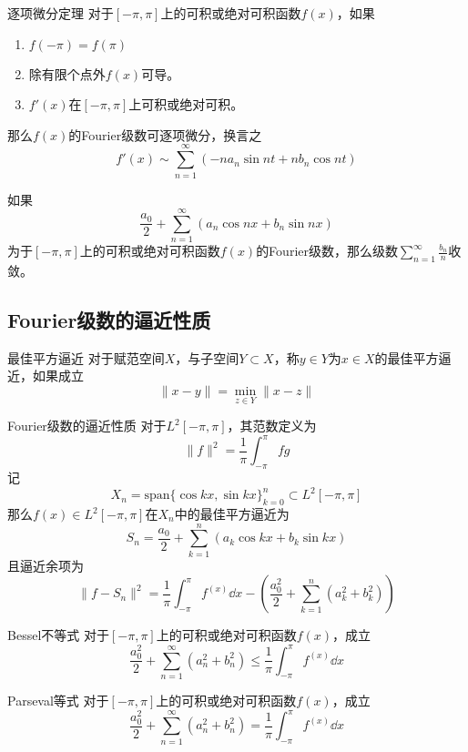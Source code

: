 \documentclass[lang = cn, scheme = chinese, thmcnt = section]{elegantbook}
\newcommand{\sub}{\subset}             %
\newcommand{\dis}{\displaystyle}
\begin{document}
\begin{theorem}{逐项微分定理}
	对于$[-\pi,\pi]$上的可积或绝对可积函数$f(x)$，如果
	\begin{enumerate}
		\item $f(-\pi)=f(\pi)$
		\item 除有限个点外$f(x)$可导。
		\item $f'(x)$在$[-\pi,\pi]$上可积或绝对可积。
	\end{enumerate}
	那么$f(x)$的Fourier级数可逐项微分，换言之
	$$
	f'(x)\sim \sum_{n=1}^{\infty}(-na_n\sin nt+nb_n\cos nt)
	$$
\end{theorem}

\begin{corollary}
	如果
	$$
	\frac{a_0}{2}+\sum_{n=1}^{\infty}(a_n\cos nx+b_n\sin nx)
	$$
	为于$[-\pi,\pi]$上的可积或绝对可积函数$f(x)$的Fourier级数，那么级数$\dis\sum_{n=1}^{\infty}\frac{b_n}{n}$收敛。
\end{corollary}

\subsection{Fourier级数的逼近性质}

\begin{definition}{最佳平方逼近}
	对于赋范空间$X$，与子空间$Y\sub X$，称$y\in Y$为$x\in X$的最佳平方逼近，如果成立
	$$
	\|x-y\|=\min_{z\in Y}\|x-z\|
	$$
\end{definition}

\begin{theorem}{Fourier级数的逼近性质}
	对于$L^2[-\pi,\pi]$，其范数定义为
	$$
	\|f\|^2=\frac{1}{\pi}\int_{-\pi}^{\pi}fg
	$$
	记
	$$
	X_n=\text{span}\{ \cos kx,\sin kx \}_{k=0}^{n}\sub L^2[-\pi,\pi]
	$$
	那么$f(x)\in L^2[-\pi,\pi]$在$X_n$中的最佳平方逼近为
	$$
	S_n=\frac{a_0}{2}+\sum_{k=1}^{n}(a_k\cos kx+b_k\sin kx)
	$$
	且逼近余项为
	$$
	\|f-S_n\|^2=\frac{1}{\pi}\int_{-\pi}^{\pi}f^(x)\dd x-\left(\frac{a_0^2}{2}+\sum_{k=1}^{n}(a_k^2+b_k^2)\right)
	$$
\end{theorem}

\begin{theorem}{Bessel不等式}
	对于$[-\pi,\pi]$上的可积或绝对可积函数$f(x)$，成立
	$$
	\frac{a_0^2}{2}+\sum_{n=1}^{\infty}(a_n^2+b_n^2)\le\frac{1}{\pi}\int_{-\pi}^{\pi}f^(x)\dd x
	$$
\end{theorem}

\begin{theorem}{Parseval等式}
	对于$[-\pi,\pi]$上的可积或绝对可积函数$f(x)$，成立
	$$
	\frac{a_0^2}{2}+\sum_{n=1}^{\infty}(a_n^2+b_n^2)=\frac{1}{\pi}\int_{-\pi}^{\pi}f^(x)\dd x
	$$
\end{theorem}
\end{document}
